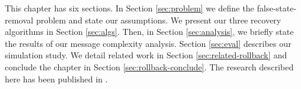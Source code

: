 This chapter has six sections. In Section \ref{sec:problem} we define the false-state-removal problem and state our assumptions.
We present our three recovery algorithms in Section \ref{sec:algs}.  Then, in Section \ref{sec:analysis}, we briefly state the results of our message complexity analysis.
Section \ref{sec:eval} describes our simulation study. We detail related work in Section \ref{sec:related-rollback} and conclude the chapter 
in Section \ref{sec:rollback-conclude}.  The research described here has been published in \cite{Gyllstrom10}.




